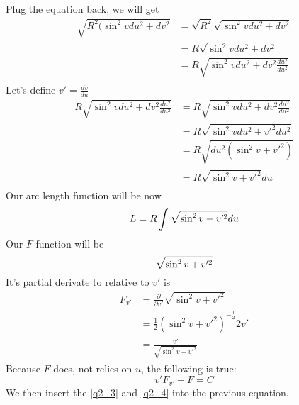 Plug the equation back, we will get
\begin{equation}
\begin{aligned}
\sqrt{R^2 (\sin^2 v du^2 + dv^2} &= \sqrt{R^2} \sqrt{\sin^2 v du^2 + dv^2}\\
&= R \sqrt{\sin^2 v du^2 + dv^2}\\
&= R \sqrt{\sin^2 v du^2 + dv^2 \frac{du^2}{du^2}}\\
\end{aligned}
\end{equation}
Let's define $v' = \frac{dv}{du}$
\begin{equation}
\begin{aligned}
R \sqrt{\sin^2 v du^2 + dv^2 \frac{du^2}{du^2}} &= R \sqrt{\sin^2 v du^2 + dv^2 \frac{du^2}{du^2}}\\
&= R \sqrt{\sin^2 v du^2 + v'^2 du^2}\\
&= R \sqrt{du^2(\sin^2 v + v'^2)}\\
&= R \sqrt{\sin^2 v + v'^2} du\\
\end{aligned}
\end{equation}
Our arc length function will be now
\begin{equation}
L = R \int \sqrt{\sin^2 v + v'^2} du\\
\end{equation}
Our $F$ function will be
\begin{equation}\label{q2_3}
 \sqrt{\sin^2 v + v'^2}\\
\end{equation}
It's partial derivate to relative to $v'$ is
\begin{equation}
\begin{aligned}\label{q2_4}
 F_{v'} &= \frac{\partial}{\partial v'} \sqrt{\sin^2 v + v'^2}\\
 &= \frac{1}{2} (\sin^2 v + v'^2)^{-\frac{1}{2}} 2v'\\
 &= \frac{v'}{\sqrt{\sin^2 v + v'^2}}
\end{aligned}
\end{equation}
Because $F$ does, not relies on $u$, the following is true:
\begin{equation}
v'F_{v'} - F = C
\end{equation}
We then insert the \ref{q2_3} and \ref{q2_4} into the previous equation.

